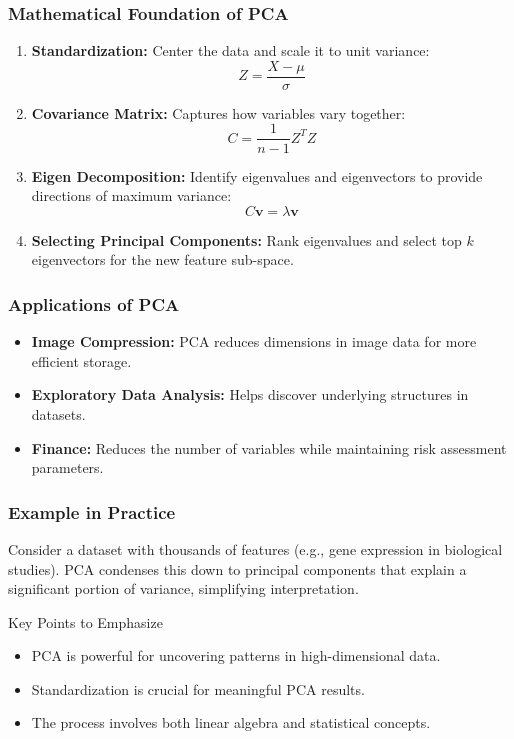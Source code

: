 \documentclass[aspectratio=169]{beamer}
\begin{document}
\begin{frame}[fragile]
    \frametitle{Mathematical Foundation of PCA}
    \begin{enumerate}
        \item \textbf{Standardization:} Center the data and scale it to unit variance:
            \begin{equation}
            Z = \frac{X - \mu}{\sigma}
            \end{equation}

        \item \textbf{Covariance Matrix:} Captures how variables vary together:
            \begin{equation}
            C = \frac{1}{n-1} Z^T Z
            \end{equation}

        \item \textbf{Eigen Decomposition:} Identify eigenvalues and eigenvectors to provide directions of maximum variance:
            \begin{equation}
            C \mathbf{v} = \lambda \mathbf{v}
            \end{equation}

        \item \textbf{Selecting Principal Components:} Rank eigenvalues and select top \( k \) eigenvectors for the new feature sub-space.
    \end{enumerate}
\end{frame}

\begin{frame}[fragile]
    \frametitle{Applications of PCA}
    \begin{itemize}
        \item \textbf{Image Compression:} PCA reduces dimensions in image data for more efficient storage.
        \item \textbf{Exploratory Data Analysis:} Helps discover underlying structures in datasets.
        \item \textbf{Finance:} Reduces the number of variables while maintaining risk assessment parameters.
    \end{itemize}
\end{frame}

\begin{frame}[fragile]
    \frametitle{Example in Practice}
    Consider a dataset with thousands of features (e.g., gene expression in biological studies). PCA condenses this down to principal components that explain a significant portion of variance, simplifying interpretation.

    \begin{block}{Key Points to Emphasize}
        \begin{itemize}
            \item PCA is powerful for uncovering patterns in high-dimensional data.
            \item Standardization is crucial for meaningful PCA results.
            \item The process involves both linear algebra and statistical concepts.
        \end{itemize}
    \end{block}
\end{frame}
\end{document}
